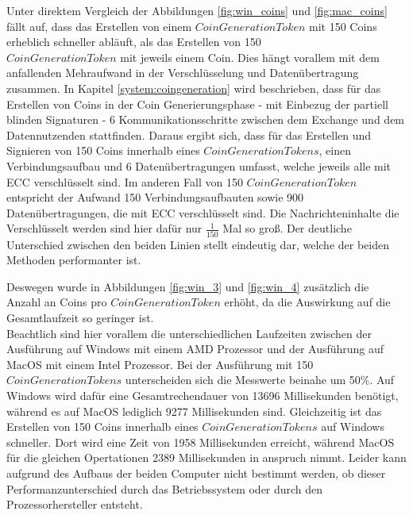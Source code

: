 \documentclass{scrreprt}
\begin{document}
Unter direktem Vergleich der Abbildungen \ref{fig:win_coins} und \ref{fig:mac_coins} fällt auf, dass das Erstellen von einem $CoinGenerationToken$ mit 150 Coins erheblich schneller abläuft, als das Erstellen von 150 \\$CoinGenerationToken$ mit jeweils einem Coin. Dies hängt vorallem mit dem anfallenden Mehraufwand in der Verschlüsselung und Datenübertragung zusammen. In Kapitel \ref{system:coingeneration} wird beschrieben, dass für das Erstellen von Coins in der Coin Generierungsphase - mit Einbezug der partiell blinden Signaturen - 6 Kommunikationsschritte zwischen dem Exchange und dem Datennutzenden stattfinden. Daraus ergibt sich, dass für das Erstellen und Signieren von 150 Coins innerhalb eines $CoinGenerationTokens$, einen Verbindungsaufbau und 6 Datenübertragungen umfasst, welche jeweils alle mit ECC verschlüsselt sind. Im anderen Fall von 150 $CoinGenerationToken$ entspricht der Aufwand 150 Verbindungsaufbauten sowie 900 Datenübertragungen, die mit ECC verschlüsselt sind. Die Nachrichteninhalte die Verschlüsselt werden sind hier dafür nur $\frac{1}{150}$ Mal so groß. Der deutliche Unterschied zwischen den beiden Linien stellt eindeutig dar, welche der beiden Methoden performanter ist.

Deswegen wurde in Abbildungen \ref{fig:win_3} und \ref{fig:win_4} zusätzlich die Anzahl an Coins pro $CoinGenerationToken$ erhöht, da die Auswirkung auf die Gesamtlaufzeit so geringer ist.\\

Beachtlich sind hier vorallem die unterschiedlichen Laufzeiten zwischen der Ausführung auf Windows mit einem AMD Prozessor und der Ausführung auf MacOS mit einem Intel Prozessor. Bei der Ausführung mit 150 $CoinGenerationTokens$ unterscheiden sich die Messwerte beinahe um 50\%. Auf Windows wird dafür eine Gesamtrechendauer von 13696 Millisekunden benötigt, während es auf MacOS lediglich 9277 Millisekunden sind. Gleichzeitig ist das Erstellen von 150 Coins innerhalb eines $CoinGenerationTokens$ auf Windows schneller. Dort wird eine Zeit von 1958 Millisekunden erreicht, während MacOS für die gleichen Opertationen 2389 Millisekunden in anspruch nimmt. Leider kann aufgrund des Aufbaus der beiden Computer nicht bestimmt werden, ob dieser Performanzunterschied durch das Betriebssystem oder durch den Prozessorhersteller entsteht.\\
\end{document}
